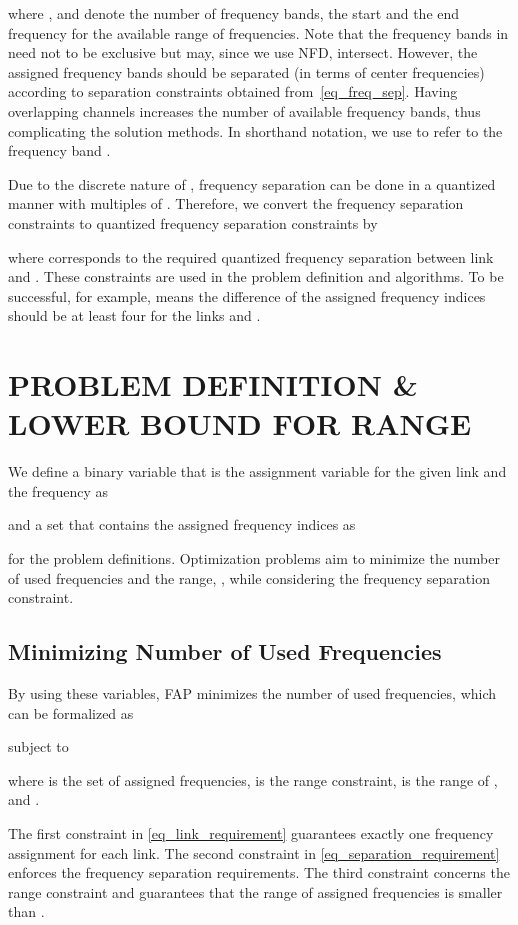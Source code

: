 \documentclass[10pt,twocolumn,twoside]{JCNtran}
\newcommand{\tbirkan}[1]{#1}
\begin{document}
where ,  and  denote the number of frequency bands, the start and the end frequency for the available range of frequencies. Note that the frequency bands in  need not to be exclusive but may, \tbirkan{since we use NFD}, intersect. However, the assigned frequency bands should be separated (in terms of center frequencies) according to separation constraints obtained from~\eqref{eq_freq_sep}. \tbirkan{Having overlapping channels increases the number of available frequency bands, thus complicating the solution methods.} In shorthand notation, we use  to refer to the frequency band . 

Due to the discrete nature of , frequency separation can be done in a quantized manner with multiples of . Therefore, we convert the frequency separation constraints to quantized frequency separation constraints by 

where  corresponds to the required quantized frequency separation between link  and . These constraints are used in the problem definition and algorithms. To be successful, for example,  means the difference of the assigned frequency indices should be at least four for the links  and .




\section{\uppercase{Problem Definition \& Lower Bound for Range}}
\label{sec_problem_definition}
We define a binary variable that is the assignment variable for the given link and the frequency as 

and a set that contains the assigned frequency indices as

for the problem definitions. Optimization problems aim to minimize the number of used frequencies and the range, , while considering the frequency separation constraint. 


\subsection{Minimizing Number of Used Frequencies}
\label{subsec_min_used_freq}
By using these variables, FAP minimizes the number of used frequencies,  which can be formalized as

subject to

where  is the set of assigned frequencies,  is the range constraint,  is the range of , and .

The first constraint in \eqref{eq_link_requirement} guarantees exactly one frequency assignment for each link. The second constraint in \eqref{eq_separation_requirement} enforces the frequency separation requirements. The third constraint concerns the range constraint and guarantees that the range of assigned frequencies is smaller than .
\end{document}
